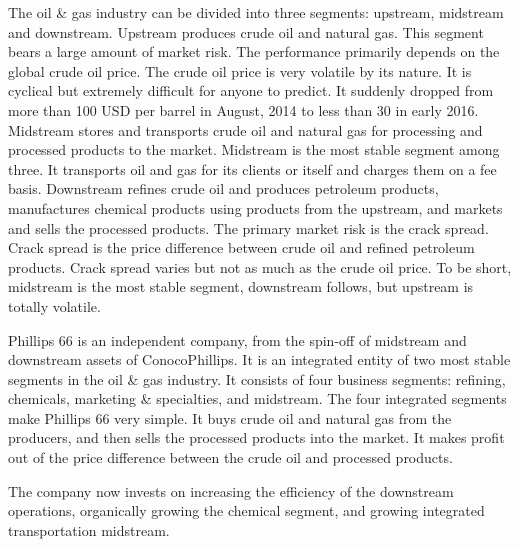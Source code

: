 \documentclass[11pt]{article}
\begin{document}
The oil \& gas industry can be divided into three segments: upstream, midstream and downstream. Upstream produces crude oil and natural gas. This segment bears a large amount of market risk. The performance primarily depends on the global crude oil price. The crude oil price is very volatile by its nature. It is cyclical but extremely difficult for anyone to predict. It suddenly dropped from more than 100 USD per barrel in August, 2014 to less than 30 in early 2016. Midstream stores and transports crude oil and natural gas for processing and processed products to the market. Midstream is the most stable segment among three. It transports oil and gas for its clients or itself and charges them on a fee basis. Downstream refines crude oil and produces petroleum products, manufactures chemical products using products from the upstream, and markets and sells the processed products. The primary market risk is the crack spread. Crack spread is the price difference between crude oil and refined petroleum products. Crack spread varies but not as much as the crude oil price. To be short, midstream is the most stable segment, downstream follows, but upstream is totally volatile.

Phillips 66 is an independent company, from the spin-off of midstream and downstream assets of ConocoPhillips. It is an integrated entity of two most stable segments in the oil \& gas industry. It consists of four business segments: refining, chemicals, marketing \& specialties, and midstream. The four integrated segments make Phillips 66 very simple. It buys crude oil and natural gas from the producers, and then sells the processed products into the market. It makes profit out of the price difference between the crude oil and processed products. 

The company now invests on increasing the efficiency of the downstream operations, organically growing the chemical segment, and growing integrated transportation midstream.    
\end{document}
